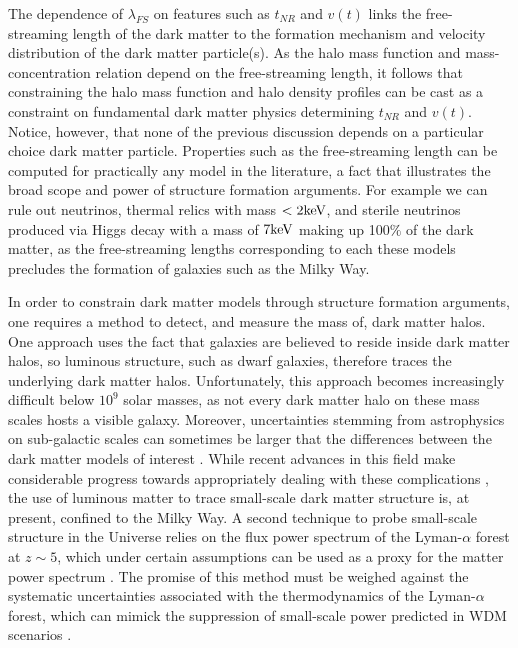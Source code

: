 The dependence of $\lambda_{FS}$ on features such as $t_{NR}$ and $v\left(t\right)$ links the free-streaming length of the dark matter to the formation mechanism and velocity distribution of the dark matter particle(s). As the halo mass function and mass-concentration relation depend on the free-streaming length, it follows that constraining the halo mass function and halo density profiles can be cast as a constraint on fundamental dark matter physics determining $t_{NR}$ and $v\left(t\right)$. Notice, however, that none of the previous discussion depends on a particular choice dark matter particle. Properties such as the free-streaming length can be computed for practically any model in the literature, a fact that illustrates the broad scope and power of structure formation arguments. For example we can rule out neutrinos, thermal relics with mass $< 2 \rm{keV}$, and sterile neutrinos produced via Higgs decay with a mass of $7 \rm{keV}$ \cite{Viel13,AbazaijanKusenko19} making up 100$\%$ of the dark matter, as the free-streaming lengths corresponding to each these models precludes the formation of galaxies such as the Milky Way. 

In order to constrain dark matter models through structure formation arguments, one requires a method to detect, and measure the mass of, dark matter halos. One approach uses the fact that galaxies are believed to reside inside dark matter halos, so luminous structure, such as dwarf galaxies, therefore traces the underlying dark matter halos. Unfortunately, this approach becomes increasingly difficult below $10^9$ solar masses, as not every dark matter halo on these mass scales hosts a visible galaxy. Moreover, uncertainties stemming from astrophysics on sub-galactic scales can sometimes be larger that the differences between the dark matter models of interest \cite{Nierenberg++16}. While recent advances in this field make considerable progress towards appropriately dealing with these complications \cite{Nadler++19}, the use of luminous matter to trace small-scale dark matter structure is, at present, confined to the Milky Way. A second technique to probe small-scale structure in the Universe relies on the flux power spectrum of the Lyman-$\alpha$ forest at $z \sim 5$, which under certain assumptions can be used as a proxy for the matter power spectrum \cite{Viel13,Irsic++17}. The promise of this method must be weighed against the systematic uncertainties associated with the thermodynamics of the Lyman-$\alpha$ forest, which can mimick the suppression of small-scale power predicted in WDM scenarios \cite{Garzilli++19}. 

